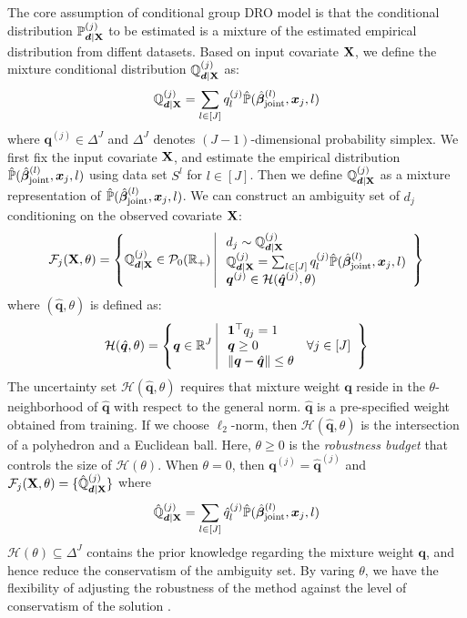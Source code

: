\documentclass[mnsc, nonblindrev]{informswp}
\newcommand{\1}[1]{\mathds{1}{\left(#1\right)}}
\begin{document}
The core assumption of conditional group DRO model is that the conditional distribution $\mathbb{P}^{(j)}_{\bm d \mid {\mathbf{X}}}$ to be estimated is a mixture of the estimated empirical distribution from diffent datasets. Based on input covariate ${\mathbf{X}}$, we define the mixture conditional distribution $\mathbb{Q}^{(j)}_{\bm d \mid {\mathbf{X}}}$ as:
\[
\mathbb{Q}^{(j)}_{\bm d \mid {\mathbf{X}}} = \sum_{l \in [J]} q_l^{(j)} \hat{\mathbb{P}}(\hat{\bm \beta}_{\text{joint}}^{(l)},\bm x_j, l)
\]
where $\bm q^{(j)} \in \Delta^J$ and $\Delta^J$ denotes $(J-1)$-dimensional probability simplex. We first fix the input covariate ${\mathbf{X}}$, and estimate the empirical distribution $\hat{\mathbb{P}}(\hat{\bm \beta}_{\text{joint}}^{(l)},\bm x_j, l)$ using data set $S^{l}$ for $l \in [J]$. Then we define $\mathbb{Q}^{(j)}_{\bm d \mid {\mathbf{X}}}$ as a mixture representation of $\hat{\mathbb{P}}(\hat{\bm \beta}_{\text{joint}}^{(l)},\bm x_j, l)$. We can construct an ambiguity set of $d_j$ conditioning on the observed covariate ${\mathbf{X}}$:
\[
\mathcal{F}_j(\mb X, \theta) = \left \{ 
	\bbq^{(j)}_{\bm d \mid \mb X} \in \mathcal{P}_0(\bbr_+) \ 
	\begin{array}{|ll} 
	\ d_j \sim \bbq^{(j)}_{\bm d \mid \mb X}	\\ 
	\
	\bbq^{(j)}_{\bm d \mid \mb X} = \sum_{l \in [J]} q_l^{(j)} \hat{\bbp}(\hat{\bm \beta}_{\text{joint}}^{(l)},\bm x_j, l)  \\
	\ \bm q^{(j)} \in \mathcal{H}(\hat{\bm q}^{(j)} , \theta)
	\end{array}
	\right  \}
\]
where $(\hat{\bm q}, \theta)$ is defined as:
\[
\mathcal{H}(\hat{\bm q}, \theta) = \left \{ \bm q \in \mathbb{R}^J \
\begin{array}{|ll} \
	\bm 1^\top q_j = 1 \\
	\ \bm q \geq 0 & \forall j \in [J] \\
	\ \|\bm q - \hat{\bm q} \| \leq \theta
\end{array}
\right \} 
\]
The uncertainty set $\mathcal{H}(\hat{\bm q}, \theta)$ requires that mixture weight $\bm q$ reside in the $\theta$-neighborhood of $\hat{\bm q}$ with respect to the general norm. $\hat{\bm q}$ is a pre-specified weight obtained from training. If we choose $\ell_2$-norm, then $\mathcal{H}(\hat{\bm q}, \theta)$ is the intersection of a polyhedron and a Euclidean ball. Here, $\theta \geq 0$ is the \textit{robustness budget} that controls the size of $\mathcal{H}(\theta)$.
When $\theta=0$, then $\bm q^{(j)} = \hat{\bm q}^{(j)}$ and $\mathcal{F}_j({\mathbf{X}}, \theta) = \{ \hat{\mathbb{Q}}^{(j)}_{\bm d \mid {\mathbf{X}}} \}$ where 
\[
\hat{\mathbb{Q}}^{(j)}_{\bm d \mid {\mathbf{X}}} = \sum_{l \in [J]} \hat{q}_l^{(j)} \hat{\mathbb{P}}(\hat{\bm \beta}_{\text{joint}}^{(l)},\bm x_j, l)
\]
$\mathcal{H}(\theta) \subseteq \Delta^{J}$ contains the prior knowledge regarding the mixture weight $\bm q$, and hence reduce the conservatism of the ambiguity set.  By varing $\theta$, we have the flexibility of adjusting the robustness of the method against the level of conservatism of the solution \citep{bertsimas2004price}.
\end{document}
